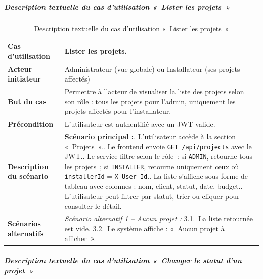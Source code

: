 \subparagraph{Description textuelle du cas d'utilisation «~Lister les projets~»}

\begin{table}[H]
  \caption{Description textuelle du cas d'utilisation «~Lister les projets~»}
  \label{tab:cu-lister-projets}
  \centering
  \begin{tabularx}{\textwidth}{|L{3.8cm}|X|}
    \hline
    \textbf{Cas d'utilisation} & Lister les projets. \\
    \hline
    \textbf{Acteur initiateur} & Administrateur (vue globale) ou Installateur (ses projets affectés) \\
    \hline
    \textbf{But du cas} & Permettre à l'acteur de visualiser la liste des projets selon son rôle : tous les projets pour l'admin, uniquement les projets affectés pour l'installateur. \\
    \hline
    \textbf{Précondition} & L'utilisateur est authentifié avec un JWT valide. \\
    \hline
    \textbf{Description du scénario} &
    \textbf{Scénario principal :}. L'utilisateur accède à la section «~Projets~».. Le frontend envoie \texttt{GET /api/projects} avec le JWT.. Le service filtre selon le rôle~: si \texttt{ADMIN}, retourne tous les projets~; si \texttt{INSTALLER}, retourne uniquement ceux où \texttt{installerId} = \texttt{X-User-Id}.. La liste s'affiche sous forme de tableau avec colonnes : nom, client, statut, date, budget.. L'utilisateur peut filtrer par statut, trier ou cliquer pour consulter le détail.\\
    \hline
    \textbf{Scénarios alternatifs} &
    \textit{Scénario alternatif 1 -- Aucun projet :}\newline
    \hspace*{6pt}3.1.~La liste retournée est vide.\newline
    \hspace*{6pt}3.2.~Le système affiche : «~Aucun projet à afficher~».\\
    \hline
  \end{tabularx}
\end{table}

\subparagraph{Description textuelle du cas d'utilisation «~Changer le statut d'un projet~»}

